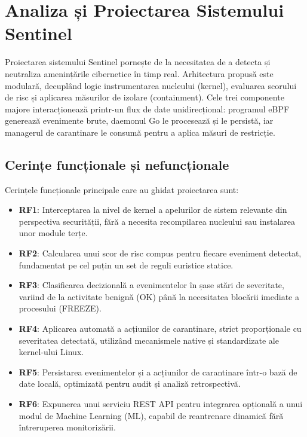 \chapter{Analiza și Proiectarea Sistemului Sentinel}
\label{chap:ch3}

\par Proiectarea sistemului Sentinel pornește de la necesitatea de a detecta și neutraliza amenințările cibernetice în timp real. Arhitectura propusă este modulară, decuplând logic instrumentarea nucleului (kernel), evaluarea scorului de risc și aplicarea măsurilor de izolare (containment). Cele trei componente majore interacționează printr-un flux de date unidirecțional: programul eBPF generează evenimente brute, daemonul Go le procesează și le persistă, iar managerul de carantinare le consumă pentru a aplica măsuri de restricție.


\section{Cerințe funcționale și nefuncționale}
\label{sec:requirements}

\par Cerințele funcționale principale care au ghidat proiectarea sunt:

\begin{itemize}
    \item \textbf{RF1}: Interceptarea la nivel de kernel a apelurilor de sistem relevante din perspectiva securității, fără a necesita recompilarea nucleului sau instalarea unor module terțe.
    \item \textbf{RF2}: Calcularea unui scor de risc compus pentru fiecare eveniment detectat, fundamentat pe cel puțin un set de reguli euristice statice.
    \item \textbf{RF3}: Clasificarea decizională a evenimentelor în șase stări de severitate, variind de la activitate benignă (OK) până la necesitatea blocării imediate a procesului (FREEZE).
    \item \textbf{RF4}: Aplicarea automată a acțiunilor de carantinare, strict proporționale cu severitatea detectată, utilizând mecanismele native și standardizate ale kernel-ului Linux.
    \item \textbf{RF5}: Persistarea evenimentelor și a acțiunilor de carantinare într-o bază de date locală, optimizată pentru audit și analiză retrospectivă.
    \item \textbf{RF6}: Expunerea unui serviciu REST API pentru integrarea opțională a unui modul de Machine Learning (ML), capabil de reantrenare dinamică fără întreruperea monitorizării.
\end{itemize}

